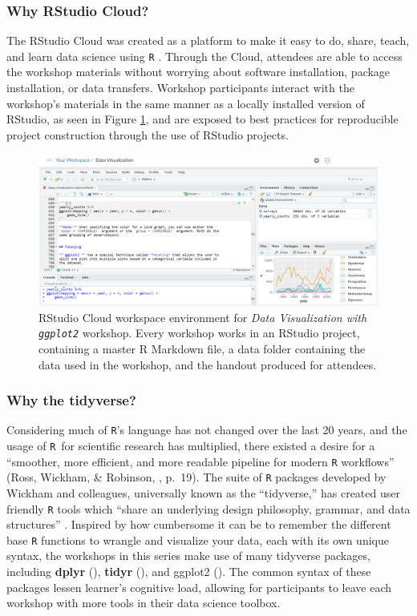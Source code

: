 \documentclass[12pt]{article}
\newcommand{\R}{\texttt{R}}
\begin{document}
\subsubsection{Why RStudio Cloud?} 

\noindent The RStudio Cloud was created as a platform to make it easy to do,
share, teach, and learn data science using \texttt{R} \citep{RStudioCloud}. 
Through the Cloud, attendees are able to access the workshop materials without
worrying about software installation, package installation, or data transfers.
Workshop participants interact with the workshop's materials in the same manner
as a locally installed version of RStudio, as seen in Figure \ref{fig:cloud},
and are exposed to best practices for reproducible project construction through 
the use of RStudio projects. 

\begin{figure}[t!]
    \centering
    \includegraphics[width = \textwidth]{images/cloud_bigger_plot_blind.png}
    \caption{RStudio Cloud workspace environment for \emph{Data Visualization
    with \texttt{ggplot2}} workshop. Every workshop works in an RStudio project,
    containing a master R Markdown file, a data folder containing the
    data used in the workshop, and the handout produced for attendees.} 
    \label{fig:cloud}
\end{figure}

\subsubsection{Why the tidyverse?}

\noindent Considering much of \texttt{R}'s language has not changed over the 
last 20 years, and the usage of \R~for scientific research has multiplied, there
existed a desire for a ``smoother, more efficient, and more readable pipeline
for modern \texttt{R} workflows'' (Ross, Wickham, \& Robinson, 
\citeyear{tidytools}, p.\ 19). The suite of \texttt{R} packages developed by 
Wickham and colleagues, universally known as the ``tidyverse,'' has 
created user friendly \texttt{R} tools which ``share an underlying design
philosophy, grammar, and data structures'' \citep{tidyverse}. Inspired by how
cumbersome it can be to remember the different base \texttt{R} functions to
wrangle and visualize your data, each with its own unique syntax, the workshops
in this series make use of many tidyverse packages, including 
\textbf{dplyr} (\citeyear{dplyr}), \textbf{tidyr} (\citeyear{tidyr}), and 
ggplot2 (\citeyear{ggplot}). The common syntax of these packages lessen
learner's cognitive load, allowing for participants to leave each workshop with
more tools in their data science toolbox. 
\end{document}
